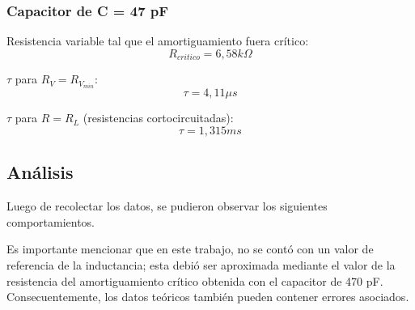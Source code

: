 \documentclass{article}
\begin{document}
            \subsubsection*{Capacitor de C = 47 pF}
                Resistencia variable tal que el amortiguamiento fuera crítico:
                \begin{equation*}
                    R_{critico} = 6,58 k\Omega 
                \end{equation*} \par
                
                $ \tau $ para $ R_V = R_{V_{min}} $: 
                \begin{equation*}
                    \tau = 4,11 \mu s 
                \end{equation*} \par

                $ \tau $ para $ R = R_L $ (resistencias cortocircuitadas):
                \begin{equation*}
                    \tau =  1,315 ms 
                \end{equation*}
        


    \subsection{Análisis}
    
    	Luego de recolectar los datos, se pudieron observar los siguientes comportamientos. \par
	Es importante mencionar que en este trabajo, no se contó con un valor de referencia de la inductancia;
     esta debió ser aproximada mediante el valor de la resistencia del amortiguamiento crítico obtenida con el capacitor de 470 pF. Consecuentemente, los datos teóricos también pueden contener errores asociados.
	
\end{document}
